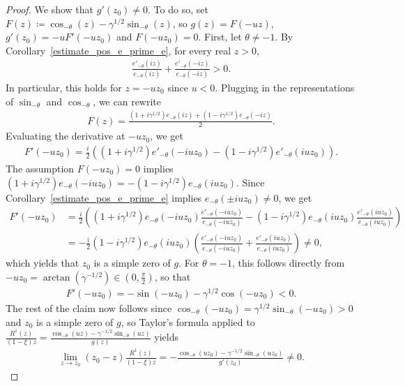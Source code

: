 \documentclass[12pt]{article}
\newcommand{\1}{\mathds{1}}
\theoremstyle{definition}
\theoremstyle{plain}
\theoremstyle{remark}
\begin{document}
\begin{proof}
We show that $g'(z_0)\ne 0$. To do so, set $F(z)\coloneqq \cos_{-\theta}(z)-\gamma^{1/2}\sin_{-\theta}(z)$, so $g(z)=F(-uz)$, $g'(z_0)=-uF'(-uz_0)$ and $F(-uz_0)=0$. First, let $\theta\neq -1$. By Corollary~\ref{estimate_pos_e_prime_e}, for every real $z>0$, 
\begin{align*}
    \frac{e'_{-\theta} (iz)}{e_{-\theta} (iz)}+\frac{e'_{-\theta}(-iz)}{e_{-\theta}(-iz)}>0.
\end{align*}
In particular, this holds for $z=-uz_0$ since $u<0$.
Plugging in the representations of $\sin_{-\theta}$ and $\cos_{-\theta}$, we can rewrite
\begin{align*}
    F(z)=\frac{(1+i\gamma^{1/2})e_{-\theta} (iz)+(1-i\gamma^{1/2})e_{-\theta}(-iz)}{2}.
\end{align*}
Evaluating the derivative at $-uz_0$, we get
\begin{align*}
    F'(-uz_0)=\frac{i}{2}\left((1+i\gamma^{1/2})e'_{-\theta} (-iuz_0)-(1-i\gamma^{1/2})e'_{-\theta}(iuz_0)\right).
\end{align*}
The assumption $F(-uz_0)=0$ implies $(1+i\gamma^{1/2})e_{-\theta}(-iuz_0)=-(1-i\gamma^{1/2})e_{-\theta}(iuz_0)$. Since Corollary~\ref{estimate_pos_e_prime_e} implies $e_{-\theta}(\pm iuz_0)\neq0$, we get
\begin{align*}
    F'(-uz_0)
    &=\frac{i}{2}\left((1+i\gamma^{1/2})e_{-\theta}(-iuz_0)\frac{e'_{-\theta}(-iuz_0)}{e_{-\theta}(-iuz_0)}-(1-i\gamma^{1/2})e_{-\theta}(iuz_0)\frac{e'_{-\theta}(iuz_0)}{e_{-\theta}(iuz_0)}\right)
    \\&=-\frac{i}{2}(1-i\gamma^{1/2})e_{-\theta} (iuz_0)\left(\frac{e'_{-\theta}(-iuz_0)}{e_{-\theta}(-iuz_0)}+\frac{e'_{-\theta} (iuz_0)}{e_{-\theta} (iuz_0)}\right)\ne 0,
\end{align*}
which yields that $z_0$ is a simple zero of $g$. For $\theta=-1$, this follows directly from $-uz_0=\arctan(\gamma^{-1/2})\in\left(0,\frac{\pi}{2}\right)$, so that
\begin{align*}
    F'(-uz_0)=-\sin(-uz_0)-\gamma^{1/2}\cos(-uz_0)<0.
\end{align*}
The rest of the claim now follows since $\cos_{-\theta}(-uz_0)=\gamma^{1/2}\sin_{-\theta}(-uz_0)> 0$ and $z_0$ is a simple zero of $g$, so Taylor's formula applied to $\frac{R^1(z)}{(1-\xi) z}=\frac{\cos_{-\theta}(uz)-\gamma^{-1/2}\sin_{-\theta}(uz)}{g(z)}$ yields
\begin{align*}
      \lim_{z\to z_0}\left(z_0-z\right)\frac{R^1(z)}{(1-\xi) z}=-\frac{\cos_{-\theta}(uz_0)-\gamma^{-1/2}\sin_{-\theta}(uz_0)}{g'(z_0)}\neq 0. \tag*{\qedhere}
\end{align*}
\end{proof}
\end{document}
